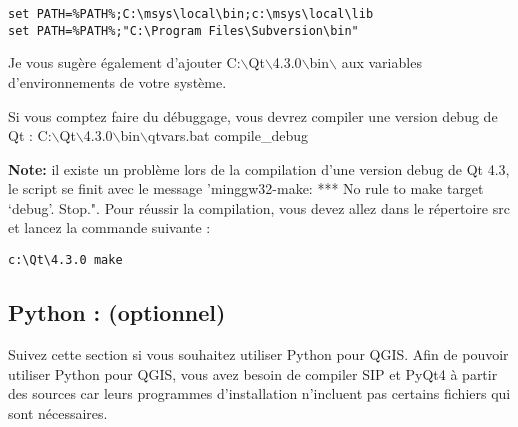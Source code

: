 \begin{verbatim}
set PATH=%PATH%;C:\msys\local\bin;c:\msys\local\lib 
set PATH=%PATH%;"C:\Program Files\Subversion\bin" 
\end{verbatim}

Je vous sugère également d'ajouter
C:$\backslash$Qt$\backslash$4.3.0$\backslash$bin$\backslash$ aux variables
d'environnements de votre système.

Si vous comptez faire du débuggage, vous devrez compiler une version debug de Qt
:
C:$\backslash$Qt$\backslash$4.3.0$\backslash$bin$\backslash$qtvars.bat
compile\_debug

\textbf{Note:} il existe un problème lors de la compilation d'une version debug
de Qt 4.3, le script se finit avec le message 'minggw32-make: *** No rule to make target `debug'. Stop.".
Pour réussir la compilation, vous devez allez dans le répertoire src et lancez la commande suivante :

\begin{verbatim}
c:\Qt\4.3.0 make 
\end{verbatim}


 \subsection{Python : (optionnel)}
 Suivez cette section si vous souhaitez utiliser Python pour QGIS. Afin de pouvoir 
 utiliser Python pour QGIS, vous avez besoin de compiler SIP et PyQt4 à partir des 
 sources car leurs programmes d'installation n'incluent pas certains fichiers qui sont nécessaires.

%
%
%

